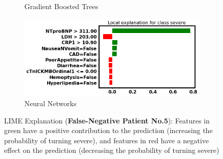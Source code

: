 \begin{figure}
\begin{subfigure}[b]{0.45\textwidth}
    \caption{Gradient Boosted Trees}
    \label{fig:lime_xgbc_5}
\end{subfigure}
\hfill
\begin{subfigure}[b]{0.45\textwidth}
    \centering
    \includegraphics[width=\textwidth]{figures/chapter_interp/lime_nn_5.png}
    \caption{Neural Networks}
    \label{fig:lime_nn_5}
\end{subfigure}
\caption{LIME Explanation (\textbf{False-Negative Patient No.5}): Features in green have a positive contribution to the prediction (increasing the probability of turning severe), and features in red have a negative effect on the prediction (decreasing the probability of turning severe)}
\label{fig:lime_5}
\end{figure}

